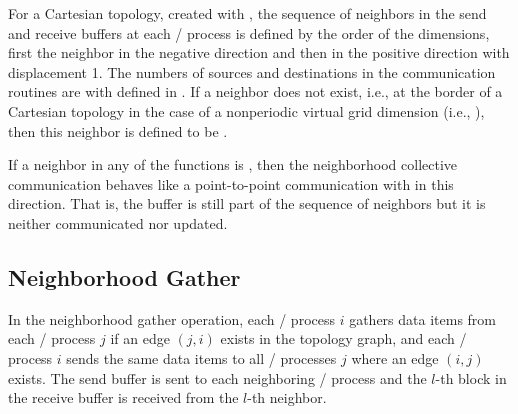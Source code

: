 For a Cartesian topology, created with , the
sequence of neighbors in the send and receive buffers at each \MPI/ process is
defined by the order of the dimensions, first the neighbor in the negative
direction and then in the positive direction with displacement 1.  The
numbers of sources and destinations in the communication routines are
 with  defined in
. If a neighbor does not exist, i.e., at the
border of a Cartesian topology in the case of a nonperiodic virtual
grid dimension (i.e., ), then this neighbor is
defined to be .

If a neighbor in any of the functions is , then
the neighborhood collective communication behaves like a point-to-point
communication with  in this direction. That is,
the buffer is still part of the sequence of neighbors but it is neither
communicated nor updated.  

\subsection{Neighborhood Gather}
\label{subsec:sparsecoll:allgather}

In the neighborhood gather operation, each \MPI/ process $i$ gathers data items from each \MPI/ process
$j$ if an edge $(j,i)$ exists in the topology graph, and each
\MPI/ process $i$ sends the same data items to all \MPI/ processes $j$ where an edge $(i,j)$
exists. The send buffer is sent to each neighboring \MPI/ process and the
$l$-th block in the receive buffer is received from the $l$-th neighbor.

